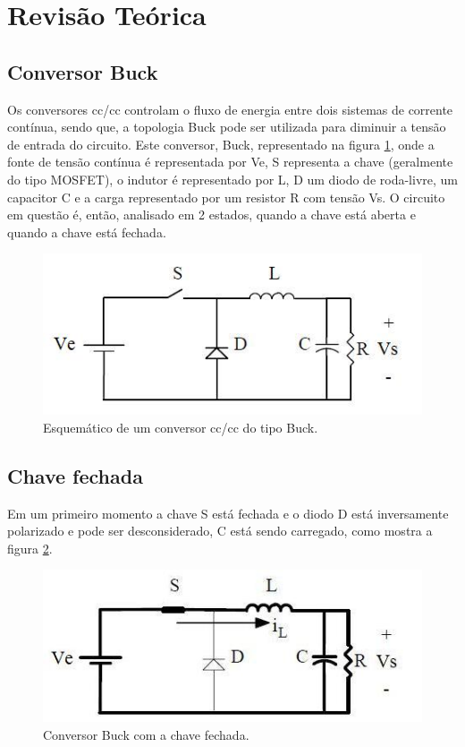 \newpage
\section{Revisão Teórica}
\subsection{Conversor Buck}
Os conversores cc/cc controlam o fluxo de energia entre dois sistemas de corrente contínua, sendo que, a topologia Buck pode ser utilizada para diminuir a tensão de entrada do circuito. Este conversor, Buck, representado na figura \ref{f_topo_buck}, onde a fonte de tensão contínua é representada por Ve, S representa a chave (geralmente do tipo MOSFET), o indutor é representado por L, D um diodo de roda-livre, um capacitor C e a carga representado por um resistor R com tensão Vs. O circuito em questão é, então, analisado em 2 estados, quando a chave está aberta e quando a chave está fechada.

\begin{figure}[H]
	\centering
	\includegraphics[scale=0.5]{Imagens/topo_buck.jpg}
	\caption{Esquemático de um conversor cc/cc do tipo Buck.}
	\label{f_topo_buck}
\end{figure}

\subsection{Chave fechada}
Em um primeiro momento a chave S está fechada e o diodo D está inversamente polarizado e pode ser desconsiderado, C está sendo carregado, como mostra a figura \ref{f_etp1}.

\begin{figure}[H]
	\centering
	\includegraphics[scale=0.5]{Imagens/etp1.jpg}
	\caption{Conversor Buck com a chave fechada.}
	\label{f_etp1}
\end{figure}

